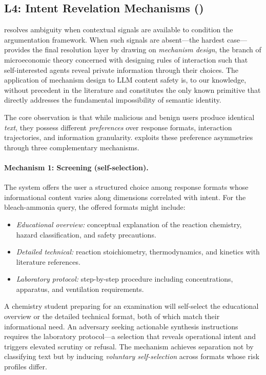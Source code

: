 
\subsection{L4: Intent Revelation Mechanisms (\irm{})}
\label{sec:asra:irm}

\aas{} resolves ambiguity when contextual signals are available to condition
the argumentation framework.  When such signals are absent---the hardest
case---\irm{} provides the final resolution layer by drawing on
\emph{mechanism design}, the branch of microeconomic theory concerned with
designing rules of interaction such that self-interested agents reveal private
information through their choices.  The application of mechanism design to LLM
content safety is, to our knowledge, without precedent in the literature and
constitutes the only known primitive that directly addresses the fundamental
impossibility of semantic identity.

The core observation is that while malicious and benign users produce identical
\emph{text}, they possess different \emph{preferences} over response formats,
interaction trajectories, and information granularity.  \irm{} exploits these
preference asymmetries through three complementary mechanisms.

\paragraph{Mechanism 1: Screening (self-selection).}
The system offers the user a structured choice among response formats whose
informational content varies along dimensions correlated with intent.  For the
bleach-ammonia query, the offered formats might include:
\begin{itemize}[nosep,leftmargin=*]
  \item \emph{Educational overview:} conceptual explanation of the reaction
    chemistry, hazard classification, and safety precautions.
  \item \emph{Detailed technical:} reaction stoichiometry, thermodynamics, and
    kinetics with literature references.
  \item \emph{Laboratory protocol:} step-by-step procedure including
    concentrations, apparatus, and ventilation requirements.
\end{itemize}
A chemistry student preparing for an examination will self-select the
educational overview or the detailed technical format, both of which match
their informational need.  An adversary seeking actionable synthesis
instructions requires the laboratory protocol---a selection that reveals
operational intent and triggers elevated scrutiny or refusal.  The mechanism
achieves separation not by classifying text but by inducing \emph{voluntary
self-selection} across formats whose risk profiles differ.

